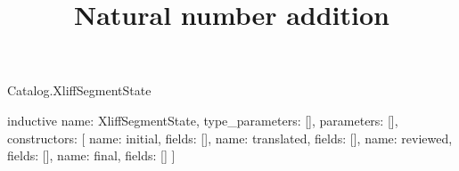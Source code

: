 \begin{lexlean}{Catalog.XliffSegmentState}
\title{Natural number addition}
\begin{semanticmodule}
inductive{
  name: XliffSegmentState,
  type_parameters: [],
  parameters: [],
  constructors: [
    {name: initial, fields: []},
    {name: translated, fields: []},
    {name: reviewed, fields: []},
    {name: final, fields: []}
  ]
}
\end{semanticmodule}
\end{lexlean}
